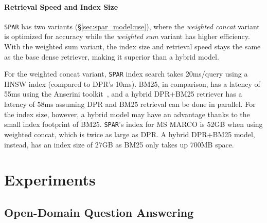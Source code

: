 \documentclass[11pt]{article}
\newcommand{\spar}{\texttt{SPAR}\xspace}
\newcommand{\secref}[1]{\S\ref{#1}}
\begin{document}
\paragraph{Retrieval Speed and Index Size}
\spar{} has two variants (\secref{sec:spar_model:use}), where the \emph{weighted concat} variant is optimized for accuracy while the \emph{weighted sum} variant has higher efficiency.
With the weighted sum variant, the index size and retrieval speed stays the same as the base dense retriever, making it superior than a hybrid model.

For the weighted concat variant, \spar{} index search takes 20ms/query using a HNSW index (compared to DPR's 10ms).
BM25, in comparison, has a latency of 55ms using the Anserini toolkit~\cite{10.1145/3404835.3462891}, and a hybrid DPR+BM25 retriever has a latency of 58ms assuming DPR and BM25 retrieval can be done in parallel.
For the index size, however, a hybrid model may have an advantage thanks to the small index footprint of BM25.
\spar{}'s index for MS MARCO is 52GB when using weighted concat, which is twice as large as DPR.
A hybrid DPR+BM25 model, instead, has an index size of 27GB as BM25 only takes up 700MB space.
 
\section{Experiments}\label{sec:exp}

\subsection{Open-Domain Question Answering}\label{sec:exp:odqa}
\end{document}
